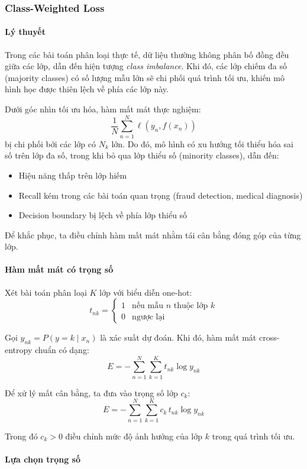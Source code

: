\subsubsection{Class-Weighted Loss}
\paragraph{Lý thuyết}
Trong các bài toán phân loại thực tế, dữ liệu thường không phân bố đồng đều giữa các lớp, dẫn đến hiện tượng \textit{class imbalance}. Khi đó, các lớp chiếm đa số (majority classes) có số lượng mẫu lớn sẽ chi phối quá trình tối ưu, khiến mô hình học được thiên lệch về phía các lớp này.

Dưới góc nhìn tối ưu hóa, hàm mất mát thực nghiệm:
\[
\frac{1}{N} \sum_{n=1}^{N} \ell(y_n, f(x_n))
\]
bị chi phối bởi các lớp có $N_k$ lớn. Do đó, mô hình có xu hướng tối thiểu hóa sai số trên lớp đa số, trong khi bỏ qua lớp thiểu số (minority classes), dẫn đến:
\begin{itemize}
    \item Hiệu năng thấp trên lớp hiếm
    \item Recall kém trong các bài toán quan trọng (fraud detection, medical diagnosis)
    \item Decision boundary bị lệch về phía lớp thiểu số
\end{itemize}

Để khắc phục, ta điều chỉnh hàm mất mát nhằm tái cân bằng đóng góp của từng lớp.

\paragraph{Hàm mất mát có trọng số}

Xét bài toán phân loại $K$ lớp với biểu diễn one-hot:
\[
t_{nk} =
\begin{cases}
1 & \text{nếu mẫu } n \text{ thuộc lớp } k \\
0 & \text{ngược lại}
\end{cases}
\]

Gọi $y_{nk} = P(y = k \mid x_n)$ là xác suất dự đoán. Khi đó, hàm mất mát cross-entropy chuẩn có dạng:
\[
E = - \sum_{n=1}^{N} \sum_{k=1}^{K} t_{nk} \log y_{nk}
\]

Để xử lý mất cân bằng, ta đưa vào trọng số lớp $c_k$:
\[
E = - \sum_{n=1}^{N} \sum_{k=1}^{K} c_k \, t_{nk} \log y_{nk}
\]

Trong đó $c_k > 0$ điều chỉnh mức độ ảnh hưởng của lớp $k$ trong quá trình tối ưu.

\paragraph{Lựa chọn trọng số}

